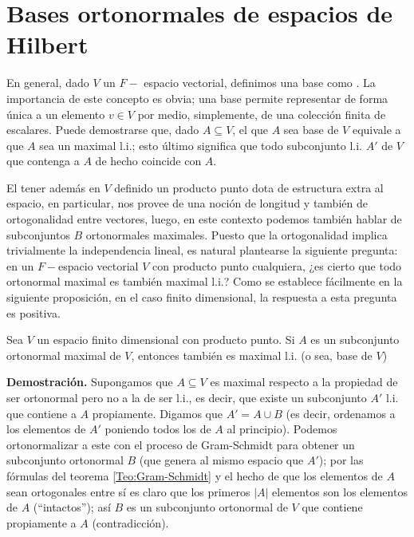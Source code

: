 \section{Bases ortonormales de espacios de Hilbert}

En general, dado $V$ un $F-$ espacio vectorial,
definimos una base como . La importancia 
de este concepto es obvia; una base permite representar
de forma única a un elemento $v \in V$ por medio, simplemente,
de una colección finita de escalares. Puede demostrarse
que, dado $A \subseteq V$, el que $A$ sea base de $V$
equivale a que $A$ sea un maximal l.i.; esto último significa
que todo subconjunto l.i. $A'$ de $V$ que contenga
a $A$ de hecho coincide con $A$.

El tener además en $V$ definido un producto punto
dota de estructura extra al espacio, en particular, 
nos provee de una noción de longitud y también 
de ortogonalidad entre vectores, luego, en este 
contexto podemos también hablar de subconjuntos $B$
ortonormales maximales. Puesto que la ortogonalidad implica
trivialmente la independencia lineal, es natural plantearse
la siguiente pregunta: en un $F-$espacio vectorial $V$
con producto punto
cualquiera, ¿es cierto que todo ortonormal maximal es también
maximal l.i.? Como se establece 
fácilmente en la siguiente proposición,
en el caso finito dimensional, la respuesta a esta
pregunta es positiva.

\begin{prop}
Sea $V$ un espacio finito dimensional
con producto punto. Si $A$
es un subconjunto ortonormal maximal de $V$, entonces
también es maximal l.i. (o sea, base de $V$)
\end{prop}
\noindent
\textbf{Demostración.}
Supongamos que $A \subseteq V$ es maximal 
respecto a la propiedad de ser ortonormal pero
no a la de ser l.i., es decir, que existe
un subconjunto $A'$ l.i. que contiene a $A$ propiamente.
Digamos que $A' = A \cup B$ (es decir, ordenamos a 
los elementos de $A'$ poniendo todos los de $A$ al principio).
Podemos ortonormalizar a este con el proceso de Gram-Schmidt
para obtener un subconjunto ortonormal $B$ (que genera
al mismo espacio que $A'$);
por las fórmulas del teorema \ref{Teo:Gram-Schmidt}
y el hecho de que los elementos de $A$ sean ortogonales
entre sí es claro que los primeros $|A|$ elementos
son los elementos de $A$ (``intactos''); así $B$
es un subconjunto ortonormal de $V$ que contiene propiamente
a $A$ (contradicción).
\QEDB
\vspace{0.2cm}


